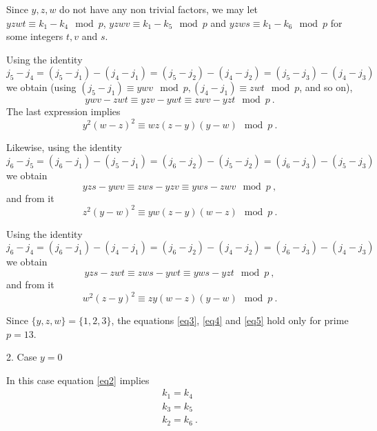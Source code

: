 Since $y,z,w$ do not have any non trivial factors, we may let
$yzwt \equiv k_1-k_4 \mod p$, $yzwv \equiv k_1-k_5 \mod p$ and
$yzws \equiv k_1-k_6 \mod p$ for some integers $t,v$ and $s$.

Using the identity
\begin{equation}
j_5-j_4 = (j_5-j_1)-(j_4-j_1) = (j_5-j_2)-(j_4-j_2)
=(j_5-j_3)-(j_4-j_3)
\end{equation}
we obtain (using $(j_5-j_1) \equiv ywv \mod p,(j_4-j_1) \equiv zwt
\mod p$, and so on),
\begin{equation}
ywv-zwt \equiv yzv - ywt \equiv zwv -yzt \mod p~.
\end{equation}
The last expression implies
\begin{equation}\label{eq3}
y^2(w-z)^2 \equiv wz(z-y)(y-w) \mod p~.
\end{equation}

Likewise, using the identity
\begin{equation}
j_6-j_5 = (j_6-j_1)-(j_5-j_1) = (j_6-j_2)-(j_5-j_2)
=(j_6-j_3)-(j_5-j_3)
\end{equation}
we obtain
\begin{equation}
yzs-ywv \equiv zws-yzv \equiv yws-zwv \mod p~,
\end{equation}
and from it
\begin{equation}\label{eq4}
z^2(y-w)^2 \equiv yw(z-y)(w-z) \mod p~.
\end{equation}

Using the identity
\begin{equation}
j_6-j_4 = (j_6-j_1)-(j_4-j_1) = (j_6-j_2)-(j_4-j_2)
=(j_6-j_3)-(j_4-j_3)
\end{equation}
we obtain
\begin{equation}
yzs-zwt \equiv zws-ywt \equiv yws-yzt \mod p~,
\end{equation}
and from it
\begin{equation}\label{eq5}
w^2(z-y)^2 \equiv zy(w-z)(y-w) \mod p~.
\end{equation}

Since $\{y,z,w\}=\{1,2,3\}$, the equations \eqref{eq3},
\eqref{eq4} and \eqref{eq5} hold only for prime $p=13$.

 2. Case $y=0$

In this case equation \eqref{eq2} implies
\begin{equation}\begin{array}{ccc}
k_1 = k_4 \\
k_3 = k_5 \\
k_2 = k_6~.
\end{array}\end{equation}


